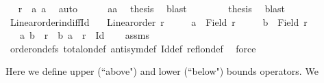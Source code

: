 \begin{isabellebody}
\ \isamarkupfalse%
\ {\isachardoublequoteopen}r\ {\isasymsubseteq}\ {\isacharbraceleft}{\kern0pt}{\isacharparenleft}{\kern0pt}a{\isacharcomma}{\kern0pt}\ a{\isacharparenright}{\kern0pt}{\isacharbraceright}{\kern0pt}{\isachardoublequoteclose}\ \isamarkupfalse%
\ auto\isanewline
\ \ \ \ \isamarkupfalse%
\ aa\ \isamarkupfalse%
\ {\isacharquery}{\kern0pt}thesis\ \isamarkupfalse%
\ blast\isanewline
\ \ \isamarkupfalse%
\isanewline
\ \ \isamarkupfalse%
\ \isamarkupfalse%
\ {\isacharquery}{\kern0pt}thesis\ \isamarkupfalse%
\ blast\isanewline
{}\isamarkupfalse%
%
\endisatagproof
{\isafoldproof}%
%
\isadelimproof
\isanewline
%
\endisadelimproof
\isanewline
{}\isamarkupfalse%
\ Linear{\isacharunderscore}{\kern0pt}order{\isacharunderscore}{\kern0pt}in{\isacharunderscore}{\kern0pt}diff{\isacharunderscore}{\kern0pt}Id{\isacharcolon}{\kern0pt}\isanewline
\ \ \ {\isachardoublequoteopen}Linear{\isacharunderscore}{\kern0pt}order\ r{\isachardoublequoteclose}\isanewline
\ \ \ \ \ {\isachardoublequoteopen}a\ {\isasymin}\ Field\ r{\isachardoublequoteclose}\isanewline
\ \ \ \ \ {\isachardoublequoteopen}b\ {\isasymin}\ Field\ r{\isachardoublequoteclose}\isanewline
\ \ \ {\isachardoublequoteopen}{\isacharparenleft}{\kern0pt}a{\isacharcomma}{\kern0pt}\ b{\isacharparenright}{\kern0pt}\ {\isasymin}\ r\ {\isasymlongleftrightarrow}\ {\isacharparenleft}{\kern0pt}b{\isacharcomma}{\kern0pt}\ a{\isacharparenright}{\kern0pt}\ {\isasymnotin}\ r\ {\isacharminus}{\kern0pt}\ Id{\isachardoublequoteclose}\isanewline
%
\isadelimproof
\ \ %
\endisadelimproof
%
\isatagproof
{}\isamarkupfalse%
\ assms\ \isamarkupfalse%
\ order{\isacharunderscore}{\kern0pt}on{\isacharunderscore}{\kern0pt}defs\ total{\isacharunderscore}{\kern0pt}on{\isacharunderscore}{\kern0pt}def\ antisym{\isacharunderscore}{\kern0pt}def\ Id{\isacharunderscore}{\kern0pt}def\ refl{\isacharunderscore}{\kern0pt}on{\isacharunderscore}{\kern0pt}def\ \isamarkupfalse%
\ force%
\endisatagproof
{\isafoldproof}%
%
\isadelimproof
%
\endisadelimproof
%
\isadelimdocument
%
\endisadelimdocument
%
\isatagdocument
%
\isamarkuptrue%
%
\endisatagdocument
{\isafolddocument}%
%
\isadelimdocument
%
\endisadelimdocument
%
\begin{isamarkuptext}%
Here we define upper (``above") and lower (``below") bounds operators. We

\end{isamarkuptext}
\end{isabellebody}
